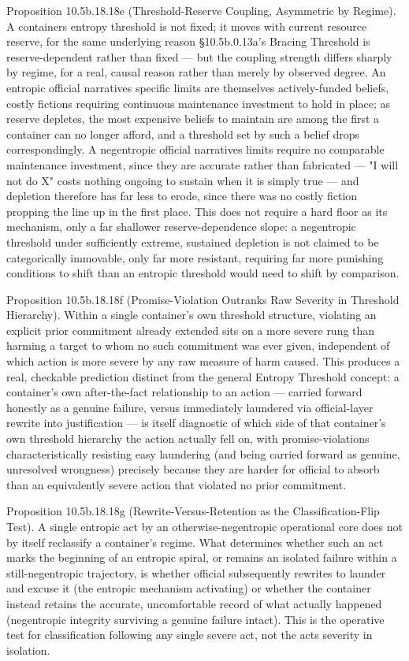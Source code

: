 \documentclass[
]{article}
\begin{document}
Proposition 10.5b.18.18e (Threshold-Reserve Coupling, Asymmetric by
Regime). A containers entropy threshold is not fixed; it moves with
current resource reserve, for the same underlying reason §10.5b.0.13a's
Bracing Threshold is reserve-dependent rather than fixed --- but the
coupling strength differs sharply by regime, for a real, causal reason
rather than merely by observed degree. An entropic official narratives
specific limits are themselves actively-funded beliefs, costly fictions
requiring continuous maintenance investment to hold in place; as reserve
depletes, the most expensive beliefs to maintain are among the first a
container can no longer afford, and a threshold set by such a belief
drops correspondingly. A negentropic official narratives limits require
no comparable maintenance investment, since they are accurate rather
than fabricated --- "I will not do X" costs nothing ongoing to sustain
when it is simply true --- and depletion therefore has far less to
erode, since there was no costly fiction propping the line up in the
first place. This does not require a hard floor as its mechanism, only a
far shallower reserve-dependence slope: a negentropic threshold under
sufficiently extreme, sustained depletion is not claimed to be
categorically immovable, only far more resistant, requiring far more
punishing conditions to shift than an entropic threshold would need to
shift by comparison.

Proposition 10.5b.18.18f (Promise-Violation Outranks Raw Severity in
Threshold Hierarchy). Within a single container's own threshold
structure, violating an explicit prior commitment already extended sits
on a more severe rung than harming a target to whom no such commitment
was ever given, independent of which action is more severe by any raw
measure of harm caused. This produces a real, checkable prediction
distinct from the general Entropy Threshold concept: a container's own
after-the-fact relationship to an action --- carried forward honestly as
a genuine failure, versus immediately laundered via official-layer
rewrite into justification --- is itself diagnostic of which side of
that container's own threshold hierarchy the action actually fell on,
with promise-violations characteristically resisting easy laundering
(and being carried forward as genuine, unresolved wrongness) precisely
because they are harder for official to absorb than an equivalently
severe action that violated no prior commitment.

Proposition 10.5b.18.18g (Rewrite-Versus-Retention as the
Classification-Flip Test). A single entropic act by an
otherwise-negentropic operational core does not by itself reclassify a
container's regime. What determines whether such an act marks the
beginning of an entropic spiral, or remains an isolated failure within a
still-negentropic trajectory, is whether official subsequently rewrites
to launder and excuse it (the entropic mechanism activating) or whether
the container instead retains the accurate, uncomfortable record of what
actually happened (negentropic integrity surviving a genuine failure
intact). This is the operative test for classification following any
single severe act, not the acts severity in isolation.
\end{document}
